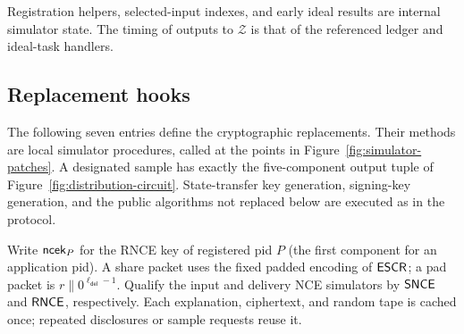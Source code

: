 Registration helpers, selected-input indexes, and early ideal results
are internal simulator state.  The timing of outputs to $\mathcal Z$
is that of the referenced ledger and ideal-task handlers.

\subsection{Replacement hooks}
\label{sec:simulator-hooks}

The following seven entries define the cryptographic replacements.
Their methods are local simulator procedures, called at the points in
Figure~\ref{fig:simulator-patches}.
A designated sample has exactly the five-component output tuple of
Figure~\ref{fig:distribution-circuit}.  State-transfer key generation,
signing-key generation, and the public algorithms not replaced below
are executed as in the protocol.

Write $\mathsf{ncek}_P$ for the RNCE key of registered pid $P$ (the first
component for an application pid).  A share packet uses the fixed padded
encoding of $\mathsf{ESCR}$; a pad packet is
$r\mathbin\|0^{\ell_{\mathsf{del}}-1}$.
Qualify the input and delivery NCE simulators by $\mathsf{SNCE}$ and $\mathsf{RNCE}$,
respectively.  Each explanation, ciphertext, and random tape is cached
once; repeated disclosures or sample requests reuse it.

